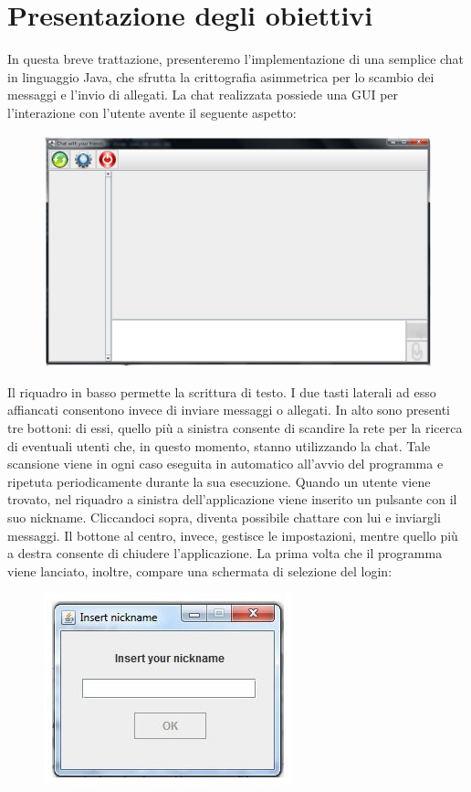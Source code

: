 \section{Presentazione degli obiettivi}
In questa breve trattazione, presenteremo l'implementazione di una semplice
chat in linguaggio Java, che sfrutta la crittografia asimmetrica per lo scambio dei
messaggi e l'invio di allegati. La chat realizzata possiede una GUI per l'interazione
con l'utente avente il seguente aspetto:
\begin{figure}[h]
\centering
\includegraphics[scale=0.4]{gui1.jpg}
\end{figure}

Il riquadro in basso permette la scrittura di testo.
I due tasti laterali ad esso affiancati
consentono invece di inviare messaggi o allegati.
In alto sono presenti tre bottoni:
di essi, quello più a sinistra consente di scandire la rete per la ricerca di eventuali 
utenti che, in questo momento, stanno utilizzando la chat.
Tale scansione viene in ogni caso eseguita in automatico all'avvio del programma
e ripetuta periodicamente durante la sua esecuzione.
Quando un utente viene trovato, nel riquadro a sinistra 
dell'applicazione viene inserito un pulsante con il suo nickname.
Cliccandoci sopra, diventa possibile chattare con lui e inviargli messaggi.
Il bottone al centro, invece, gestisce le impostazioni,
mentre quello più a destra consente di chiudere l'applicazione.
La prima volta che il programma viene lanciato, inoltre,
compare una schermata di selezione del login:
\begin{figure}[h]
\centering
\includegraphics[scale=0.5]{login1.jpg}
\end{figure}

